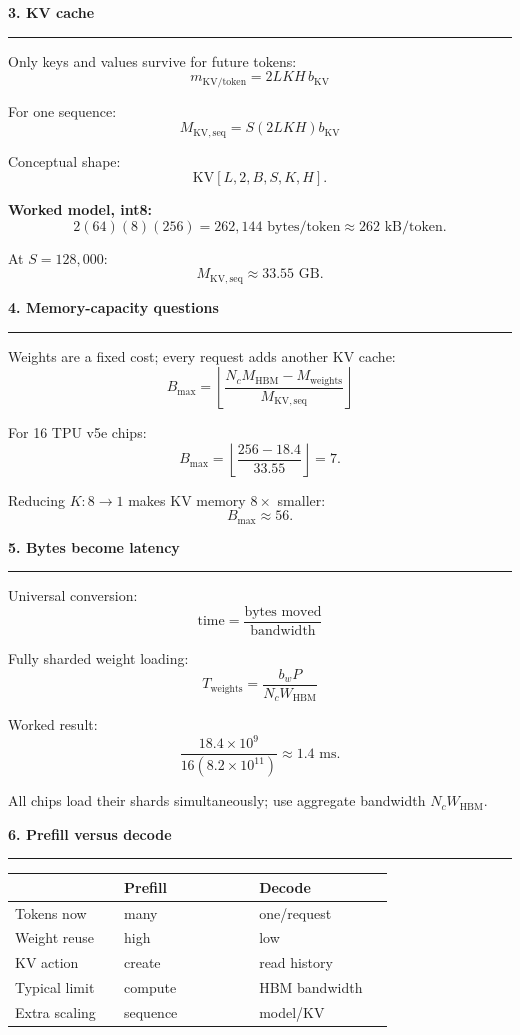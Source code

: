 \documentclass[8pt,a4paper]{extarticle}
\newcommand{\sect}[1]{%
  \vspace{2pt}%
  {\color{DeepBlue}\normalsize\bfseries #1}\par
  \vspace{0.5pt}\hrule\vspace{1.5pt}
}
\newcommand{\formula}[1]{%
  \[
    \boxed{\displaystyle #1}
  \]
}
\begin{document}
\begin{multicols}{2}
\sect{3. KV cache}

Only keys and values survive for future tokens:
\formula{m_{\mathrm{KV/token}}=2LKH\,b_{\mathrm{KV}}}

For one sequence:
\formula{M_{\mathrm{KV,seq}}=S(2LKH)b_{\mathrm{KV}}}

Conceptual shape:
\[
\mathrm{KV}[L,2,B,S,K,H].
\]

\textbf{Worked model, int8:}
\[
2(64)(8)(256)=262{,}144\text{ bytes/token}
\approx\boxed{262\text{ kB/token}}.
\]

At $S=128{,}000$:
\[
M_{\mathrm{KV,seq}}\approx\boxed{33.55\text{ GB}}.
\]

\sect{4. Memory-capacity questions}

Weights are a fixed cost; every request adds another KV cache:
\formula{
B_{\max}=
\left\lfloor
\frac{N_cM_{\mathrm{HBM}}-M_{\mathrm{weights}}}
{M_{\mathrm{KV,seq}}}
\right\rfloor
}

For 16 TPU v5e chips:
\[
B_{\max}=
\left\lfloor\frac{256-18.4}{33.55}\right\rfloor
=\boxed{7}.
\]

Reducing $K:8\to1$ makes KV memory $8\times$ smaller:
\[
\boxed{B_{\max}\approx56}.
\]

\sect{5. Bytes become latency}

Universal conversion:
\formula{\text{time}=\frac{\text{bytes moved}}{\text{bandwidth}}}

Fully sharded weight loading:
\formula{
T_{\mathrm{weights}}=
\frac{b_wP}{N_cW_{\mathrm{HBM}}}
}

Worked result:
\[
\frac{18.4\times10^9}{16(8.2\times10^{11})}
\approx\boxed{1.4\text{ ms}}.
\]

All chips load their shards simultaneously; use aggregate bandwidth
$N_cW_{\mathrm{HBM}}$.

\sect{6. Prefill versus decode}

\begin{tabular}{@{}p{0.25\linewidth}p{0.31\linewidth}p{0.31\linewidth}@{}}
\toprule
 & \textbf{Prefill} & \textbf{Decode}\\
\midrule
Tokens now & many & one/request\\
Weight reuse & high & low\\
KV action & create & read history\\
Typical limit & compute & HBM bandwidth\\
Extra scaling & sequence & model/KV\\
\bottomrule
\end{tabular}


\end{multicols}
\end{document}
